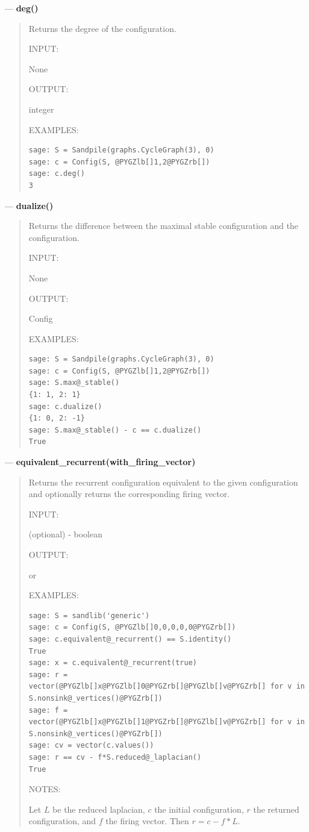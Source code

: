 \documentclass[letterpaper,10pt,english]{manual}
\begin{document}
---
\hypertarget{deg}{}
\textbf{deg()}
\begin{quote}

Returns the degree of the configuration.

INPUT:

None

OUTPUT:

integer

EXAMPLES:

\begin{Verbatim}[commandchars=@\[\]]
sage: S = Sandpile(graphs.CycleGraph(3), 0)
sage: c = Config(S, @PYGZlb[]1,2@PYGZrb[])
sage: c.deg()
3
\end{Verbatim}
\end{quote}

---
\hypertarget{dualize}{}
\textbf{dualize()}
\begin{quote}

Returns the difference between the maximal stable configuration and the
configuration.

INPUT:

None

OUTPUT:

Config

EXAMPLES:

\begin{Verbatim}[commandchars=@\[\]]
sage: S = Sandpile(graphs.CycleGraph(3), 0)
sage: c = Config(S, @PYGZlb[]1,2@PYGZrb[])
sage: S.max@_stable()
{1: 1, 2: 1}
sage: c.dualize()
{1: 0, 2: -1}
sage: S.max@_stable() - c == c.dualize()
True
\end{Verbatim}
\end{quote}

---
\hypertarget{equivalent-recurrent-with-firing-vector}{}
\textbf{equivalent\_recurrent(with\_firing\_vector)}
\begin{quote}

Returns the recurrent configuration equivalent to the given
configuration and optionally returns the corresponding firing vector.

INPUT:

 (optional) -  boolean

OUTPUT:

 or 

EXAMPLES:

\begin{Verbatim}[commandchars=@\[\]]
sage: S = sandlib('generic')
sage: c = Config(S, @PYGZlb[]0,0,0,0,0@PYGZrb[])
sage: c.equivalent@_recurrent() == S.identity()
True
sage: x = c.equivalent@_recurrent(true)
sage: r = vector(@PYGZlb[]x@PYGZlb[]0@PYGZrb[]@PYGZlb[]v@PYGZrb[] for v in S.nonsink@_vertices()@PYGZrb[])
sage: f = vector(@PYGZlb[]x@PYGZlb[]1@PYGZrb[]@PYGZlb[]v@PYGZrb[] for v in S.nonsink@_vertices()@PYGZrb[])
sage: cv = vector(c.values())
sage: r == cv - f*S.reduced@_laplacian()
True
\end{Verbatim}

NOTES:

Let $L$ be the reduced laplacian, $c$ the initial configuration, $r$ the
returned configuration, and $f$ the firing vector.  Then $r = c - f *
L$.
\end{quote}
\end{document}
